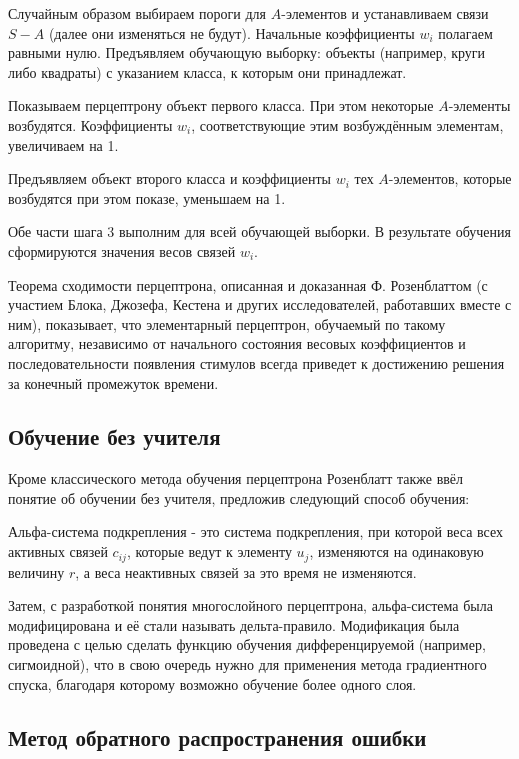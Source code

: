 Случайным образом выбираем пороги для $A$-элементов и устанавливаем связи $S-A$ (далее они изменяться не будут).
Начальные коэффициенты $w_i$ полагаем равными нулю.
Предъявляем обучающую выборку: объекты (например, круги либо квадраты) с указанием класса, к которым они принадлежат.

Показываем перцептрону объект первого класса. При этом некоторые $A$-элементы возбудятся. Коэффициенты $w_i$, соответствующие этим возбуждённым элементам, увеличиваем на 1.

Предъявляем объект второго класса и коэффициенты $w_i$ тех $A$-элементов, которые возбудятся при этом показе, уменьшаем на 1.
    
Обе части шага 3 выполним для всей обучающей выборки. В результате обучения сформируются значения весов связей $w_i$.

Теорема сходимости перцептрона, описанная и доказанная Ф. Розенблаттом (с участием Блока, Джозефа, Кестена и других исследователей, работавших вместе с ним), показывает, что элементарный перцептрон, обучаемый по такому алгоритму, независимо от начального состояния весовых коэффициентов и последовательности появления стимулов всегда приведет к достижению решения за конечный промежуток времени.

\subsection{Обучение без учителя}

Кроме классического метода обучения перцептрона Розенблатт также ввёл понятие об обучении без учителя, предложив следующий способ обучения:

Альфа-система подкрепления - это система подкрепления, при которой веса всех активных связей $c_{ij}$, которые ведут к элементу $u_j$, изменяются на одинаковую величину $r$, а веса неактивных связей за это время не изменяются.

Затем, с разработкой понятия многослойного перцептрона, альфа-система была модифицирована и её стали называть дельта-правило. Модификация была проведена с целью сделать функцию обучения дифференцируемой (например, сигмоидной), что в свою очередь нужно для применения метода градиентного спуска, благодаря которому возможно обучение более одного слоя.

\subsection{Метод обратного распространения ошибки}

